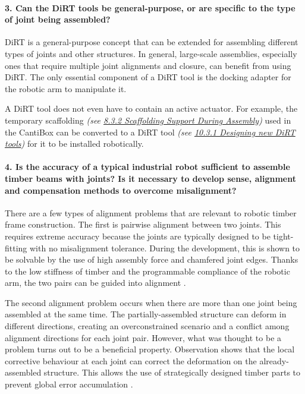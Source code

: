 \paragraph{3. Can the DiRT tools be general-purpose, or are specific to the type of joint being assembled?}

DiRT is a general-purpose concept that can be extended for assembling different types of joints and other structures. In general, large-scale assemblies, especially ones that require multiple joint alignments and closure, can benefit from using DiRT. The only essential component of a DiRT tool is the docking adapter for the robotic arm to manipulate it. 

A DiRT tool does not even have to contain an active actuator. For example, the temporary scaffolding \textit{(see \ul{8.3.2 Scaffolding Support During Assembly})} used in the CantiBox can be converted to a DiRT tool \textit{(see \ul{10.3.1 Designing new DiRT tools}) }for it to be installed robotically.

\paragraph{4. Is the accuracy of a typical industrial robot sufficient to assemble timber beams with joints? Is it necessary to develop sense, alignment and compensation methods to overcome misalignment?}

There are a few types of alignment problems that are relevant to robotic timber frame construction. The first is pairwise alignment between two joints. This requires extreme accuracy because the joints are typically designed to be tight-fitting with no misalignment tolerance. During the development, this is shown to be solvable by the use of high assembly force and chamfered joint edges. Thanks to the low stiffness of timber and the programmable compliance of the robotic arm, the two pairs can be guided into alignment .

The second alignment problem occurs when there are more than one joint being assembled at the same time. The partially-assembled structure can deform in different directions, creating an overconstrained scenario and a conflict among alignment directions for each joint pair. However, what was thought to be a problem turns out to be a beneficial property. Observation shows that the local corrective behaviour at each joint can correct the deformation on the already-assembled structure. This allows the use of strategically designed timber parts to prevent global error accumulation .

